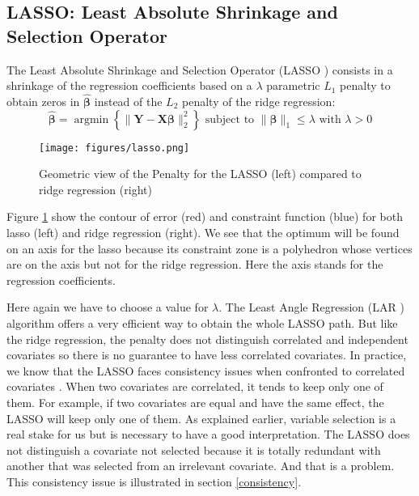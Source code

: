 \documentclass[12pt,a4paper]{report}
\begin{document}
			
		\subsection{LASSO: Least Absolute Shrinkage and Selection Operator }		%

The Least Absolute Shrinkage and Selection Operator (\textsc{LASSO} \cite{tibshirani1996regression,tibshiranilasso}) consists in a shrinkage of the regression coefficients based on a $\lambda$ parametric $L_1$ penalty to obtain zeros in $\hat{\boldsymbol{\beta}}$ instead of the $L_2$ penalty of the ridge regression:
		\begin{equation}
		 \boldsymbol{\hat{\beta}}=\operatorname{argmin} \left\lbrace \parallel \boldsymbol{Y}-\boldsymbol{X\beta}\parallel_2^2 \right\rbrace \textrm{ subject to } \parallel\boldsymbol{\beta} \parallel_1\leq \lambda \textrm{ with } \lambda>0
		\end{equation}	
		
		\begin{figure}[h!]
			\centering
			\texttt{[image: figures/lasso.png]} 
			\caption{Geometric view of the Penalty for the LASSO (left) compared to ridge regression (right)} \label{lassogeom}
		\end{figure}
		Figure \ref{lassogeom} show the contour of error (red) and constraint function (blue) for both lasso (left) and ridge regression (right). We see that the optimum will be found on an axis for the lasso because its constraint zone is a polyhedron whose vertices are on the axis but not for the ridge regression. Here the axis stands for the regression coefficients.
		
		Here again we have to choose a value for $\lambda$.
	 The Least Angle Regression (\textsc{LAR} \cite{efron2004least}) algorithm offers a very efficient way to obtain the whole LASSO path.  But like the ridge regression, the penalty does not distinguish correlated and independent covariates so there is no guarantee to have less correlated covariates. In practice, we know that the LASSO faces consistency issues when confronted to correlated covariates \cite{Zhao2006MSC}. When two covariates are correlated, it tends to keep only one of them. For example, if two covariates are equal and have the same effect, the LASSO will keep only one of them. As explained earlier, variable selection is a real stake for us but is necessary to have a good interpretation. The LASSO does not distinguish a covariate not selected because it is totally redundant with another that was selected from an irrelevant covariate. And that is a problem. This consistency issue is illustrated in section \ref{consistency}.
\end{document}
